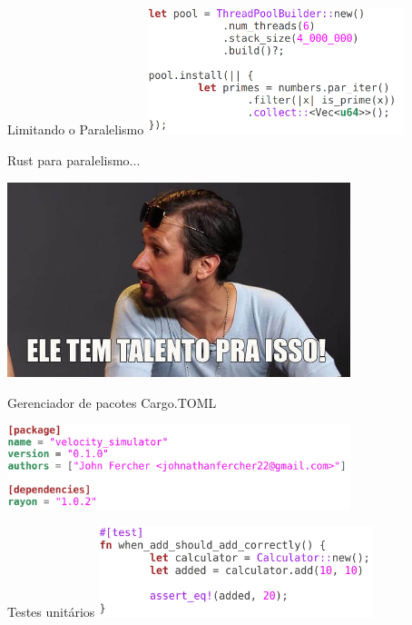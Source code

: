 \documentclass[aspectratio=169]{beamer}
\begin{document}
\begin{frame}{Limitando o Paralelismo}
	\includegraphics[width=7.5cm]{imgs/limit_threds.png}	
\end{frame}

\begin{frame}[noframenumbering]{Rust para paralelismo...}
	\begin{center}
		\includegraphics[width=10.0cm]{imgs/choque_de_cultura_04.jpg}	
	\end{center}
\end{frame}


\begin{frame}{Gerenciador de pacotes}
	Cargo.TOML
	
	\includegraphics[width=10cm]{imgs/cargo.png}	
\end{frame}

\begin{frame}{Testes unitários}
	\includegraphics[width=8cm]{imgs/unit_tests.png}	
\end{frame}
\end{document}

